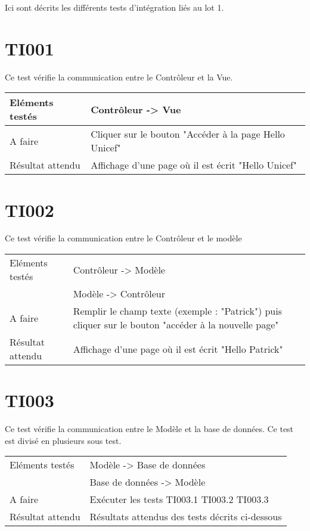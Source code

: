 Ici sont décrits les différents tests d'intégration liés au lot 1.

\section{TI001}
	 Ce test vérifie la communication entre le Contrôleur et la Vue.
	 \begin{center}
     	\begin{tabular}[h]{|p{}|p{}|}
		\hline
			Eléments testés & Contrôleur -> Vue \\\hline
    			A faire & Cliquer sur le bouton "Accéder à la page Hello Unicef" \\\hline
    			Résultat attendu & Affichage d'une page où il est écrit "Hello Unicef" \\\hline
     	\end{tabular}
  	\end{center}	
	
\section{TI002}
	Ce test vérifie la communication entre le Contrôleur et le modèle
	\begin{center}
     	\begin{tabular}[h]{|p{}|p{}|}
		\hline
			Eléments testés & Contrôleur -> Modèle \\
						    &  Modèle -> Contrôleur \\\hline
    			A faire & Remplir le champ texte (exemple : "Patrick") puis cliquer sur le bouton "accéder à la nouvelle page" \\\hline
    			Résultat attendu & Affichage d'une page où il est écrit "Hello Patrick" \\\hline
     	\end{tabular}
  	\end{center}	
  	
  	
\section{TI003}
	Ce test vérifie la communication entre le Modèle et la base de données. Ce test est divisé en plusieurs sous test.
	\begin{center}
     	\begin{tabular}[h]{|p{}|p{}|}
		\hline
			Eléments testés & Modèle -> Base de données  \\
						    &  Base de données -> Modèle \\\hline
    			A faire & Exécuter les tests TI003.1 TI003.2 TI003.3 \\\hline
    			Résultat attendu & Résultats attendus des tests décrits ci-dessous \\\hline
     	\end{tabular}
  	\end{center}	
  	
